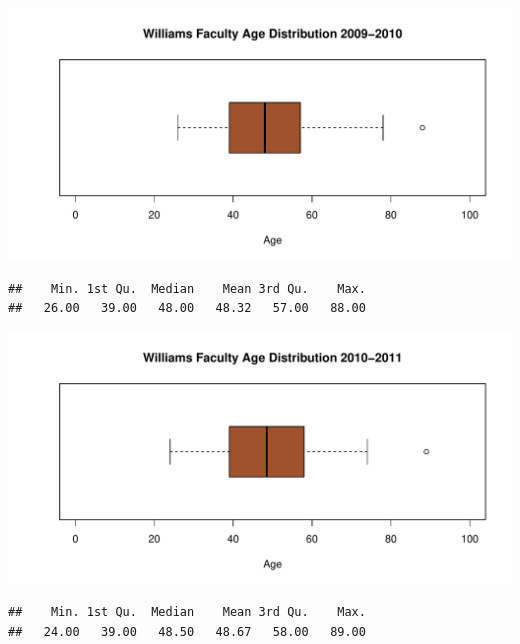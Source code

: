 \documentclass[12pt,a4paper]{article}\usepackage[]{graphicx}\usepackage[]{color}
\makeatletter
\def\maxwidth{ %
  \ifdim\Gin@nat@width>\linewidth
    \linewidth
  \else
    \Gin@nat@width
  \fi
}
\newenvironment{kframe}{%
 \def\at@end@of@kframe{}%
 \ifinner\ifhmode%
  \def\at@end@of@kframe{\end{minipage}}%
  \begin{minipage}{\columnwidth}%
 \fi\fi%
 \def\FrameCommand##1{\hskip\@totalleftmargin \hskip-\fboxsep
 \colorbox{shadecolor}{##1}\hskip-\fboxsep
     \hskip-\linewidth \hskip-\@totalleftmargin \hskip\columnwidth}%
 \MakeFramed {\advance\hsize-\width
   \@totalleftmargin\z@ \linewidth\hsize
   \@setminipage}}%
 {\par\unskip\endMakeFramed%
 \at@end@of@kframe}
\newenvironment{knitrout}{}{} %
\theoremstyle{definition}
\makeatother
\begin{document}
\begin{knitrout}
\color{fgcolor}
\includegraphics[width=\maxwidth]{figure/unnamed-chunk-24-1} 

\end{knitrout}

\begin{knitrout}
\color{fgcolor}\begin{kframe}
\begin{verbatim}
##    Min. 1st Qu.  Median    Mean 3rd Qu.    Max. 
##   26.00   39.00   48.00   48.32   57.00   88.00
\end{verbatim}
\end{kframe}
\end{knitrout}


\begin{knitrout}
\color{fgcolor}
\includegraphics[width=\maxwidth]{figure/unnamed-chunk-26-1} 

\end{knitrout}

\begin{knitrout}
\color{fgcolor}\begin{kframe}
\begin{verbatim}
##    Min. 1st Qu.  Median    Mean 3rd Qu.    Max. 
##   24.00   39.00   48.50   48.67   58.00   89.00
\end{verbatim}
\end{kframe}
\end{knitrout}
\end{document}
